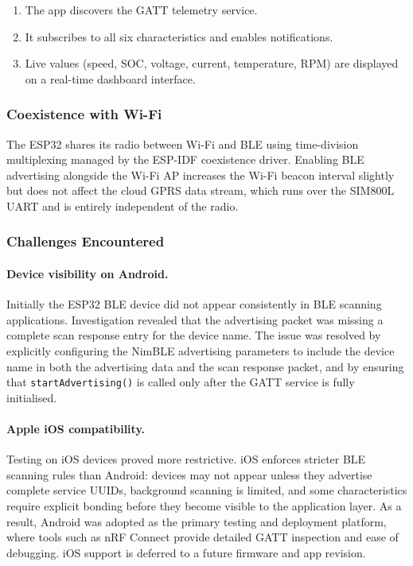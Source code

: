 \begin{enumerate}
    \item The app discovers the GATT telemetry service.
    \item It subscribes to all six characteristics and enables notifications.
    \item Live values (speed, SOC, voltage, current, temperature, RPM) are displayed on a real-time dashboard interface.
\end{enumerate}

\subsubsection*{Coexistence with Wi-Fi}

The ESP32 shares its radio between Wi-Fi and BLE using time-division multiplexing managed by the ESP-IDF coexistence driver. Enabling BLE advertising alongside the Wi-Fi AP increases the Wi-Fi beacon interval slightly but does not affect the cloud GPRS data stream, which runs over the SIM800L UART and is entirely independent of the radio.

\subsubsection*{Challenges Encountered}

\paragraph{Device visibility on Android.}
Initially the ESP32 BLE device did not appear consistently in BLE scanning applications. Investigation revealed that the advertising packet was missing a complete scan response entry for the device name. The issue was resolved by explicitly configuring the NimBLE advertising parameters to include the device name in both the advertising data and the scan response packet, and by ensuring that \texttt{startAdvertising()} is called only after the GATT service is fully initialised.

\paragraph{Apple iOS compatibility.}
Testing on iOS devices proved more restrictive. iOS enforces stricter BLE scanning rules than Android: devices may not appear unless they advertise complete service UUIDs, background scanning is limited, and some characteristics require explicit bonding before they become visible to the application layer. As a result, Android was adopted as the primary testing and deployment platform, where tools such as nRF Connect provide detailed GATT inspection and ease of debugging. iOS support is deferred to a future firmware and app revision.

